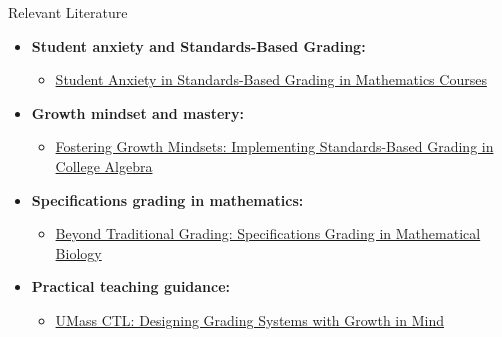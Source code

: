 \documentclass[dvipsnames]{beamer}
\begin{document}
\begin{frame}{Relevant Literature}
\small
\begin{itemize}
    \item \textbf{Student anxiety and Standards-Based Grading:}
    \begin{itemize}
        \item \href{https://link.springer.com/article/10.1007/s10755-019-09489-3}{Student Anxiety in Standards-Based Grading in Mathematics Courses}
    \end{itemize}
    
    \item \textbf{Growth mindset and mastery:}
    \begin{itemize}
        \item \href{https://peer.asee.org/fostering-growth-mindsets-implementing-standards-based-grading-in-college-algebra}{Fostering Growth Mindsets: Implementing Standards-Based Grading in College Algebra}
    \end{itemize}
    
    \item \textbf{Specifications grading in mathematics:}
    \begin{itemize}
        \item \href{https://www.tandfonline.com/doi/full/10.1080/0020739X.2025.2519130}{Beyond Traditional Grading: Specifications Grading in Mathematical Biology}
    \end{itemize}
    
    \item \textbf{Practical teaching guidance:}
    \begin{itemize}
        \item \href{https://www.umass.edu/ctl/how-do-i-design-my-grading-system-growth-mind}{UMass CTL: Designing Grading Systems with Growth in Mind}
    \end{itemize}
\end{itemize}
\end{frame}
\end{document}
